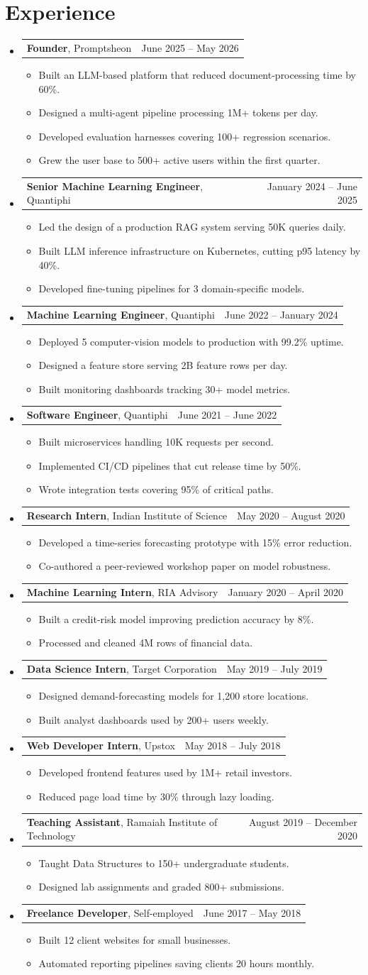 \documentclass[letterpaper,11pt]{article}
\makeatletter
\newcommand{\resumeItem}[1]{%
  \item\small{#1 \vspace{-1pt}}%
}
\newcommand{\resumeSubheading}[3]{%
  \vspace{2pt}\item
    \begin{tabular*}{\linewidth}[t]{l@{\extracolsep{\fill}}r}
      \textbf{#1}, #2 & #3 \\
    \end{tabular*}\vspace{-4pt}%
}
\newcommand{\resumeSubHeadingListStart}{\begin{itemize}[leftmargin=0.15in, label={}, parsep=0pt, topsep=0pt, itemsep=4pt]}
\newcommand{\resumeSubHeadingListEnd}{\end{itemize}}
\newcommand{\resumeItemListStart}{\begin{itemize}[leftmargin=0.15in, parsep=0pt, topsep=2pt, itemsep=3pt, label=$\bullet$]}
\newcommand{\resumeItemListEnd}{\end{itemize}\vspace{-2pt}}
\makeatother
\begin{document}
\section{Experience}
\resumeSubHeadingListStart
\resumeSubheading{Founder}{Promptsheon}{June 2025 -- May 2026}
\resumeItemListStart
\resumeItem{Built an LLM-based platform that reduced document-processing time by 60\%.}
\resumeItem{Designed a multi-agent pipeline processing 1M+ tokens per day.}
\resumeItem{Developed evaluation harnesses covering 100+ regression scenarios.}
\resumeItem{Grew the user base to 500+ active users within the first quarter.}
\resumeItemListEnd
\resumeSubheading{Senior Machine Learning Engineer}{Quantiphi}{January 2024 -- June 2025}
\resumeItemListStart
\resumeItem{Led the design of a production RAG system serving 50K queries daily.}
\resumeItem{Built LLM inference infrastructure on Kubernetes, cutting p95 latency by 40\%.}
\resumeItem{Developed fine-tuning pipelines for 3 domain-specific models.}
\resumeItemListEnd
\resumeSubheading{Machine Learning Engineer}{Quantiphi}{June 2022 -- January 2024}
\resumeItemListStart
\resumeItem{Deployed 5 computer-vision models to production with 99.2\% uptime.}
\resumeItem{Designed a feature store serving 2B feature rows per day.}
\resumeItem{Built monitoring dashboards tracking 30+ model metrics.}
\resumeItemListEnd
\resumeSubheading{Software Engineer}{Quantiphi}{June 2021 -- June 2022}
\resumeItemListStart
\resumeItem{Built microservices handling 10K requests per second.}
\resumeItem{Implemented CI/CD pipelines that cut release time by 50\%.}
\resumeItem{Wrote integration tests covering 95\% of critical paths.}
\resumeItemListEnd
\resumeSubheading{Research Intern}{Indian Institute of Science}{May 2020 -- August 2020}
\resumeItemListStart
\resumeItem{Developed a time-series forecasting prototype with 15\% error reduction.}
\resumeItem{Co-authored a peer-reviewed workshop paper on model robustness.}
\resumeItemListEnd
\resumeSubheading{Machine Learning Intern}{RIA Advisory}{January 2020 -- April 2020}
\resumeItemListStart
\resumeItem{Built a credit-risk model improving prediction accuracy by 8\%.}
\resumeItem{Processed and cleaned 4M rows of financial data.}
\resumeItemListEnd
\resumeSubheading{Data Science Intern}{Target Corporation}{May 2019 -- July 2019}
\resumeItemListStart
\resumeItem{Designed demand-forecasting models for 1,200 store locations.}
\resumeItem{Built analyst dashboards used by 200+ users weekly.}
\resumeItemListEnd
\resumeSubheading{Web Developer Intern}{Upstox}{May 2018 -- July 2018}
\resumeItemListStart
\resumeItem{Developed frontend features used by 1M+ retail investors.}
\resumeItem{Reduced page load time by 30\% through lazy loading.}
\resumeItemListEnd
\resumeSubheading{Teaching Assistant}{Ramaiah Institute of Technology}{August 2019 -- December 2020}
\resumeItemListStart
\resumeItem{Taught Data Structures to 150+ undergraduate students.}
\resumeItem{Designed lab assignments and graded 800+ submissions.}
\resumeItemListEnd
\resumeSubheading{Freelance Developer}{Self-employed}{June 2017 -- May 2018}
\resumeItemListStart
\resumeItem{Built 12 client websites for small businesses.}
\resumeItem{Automated reporting pipelines saving clients 20 hours monthly.}
\resumeItemListEnd
\resumeSubHeadingListEnd
\end{document}
